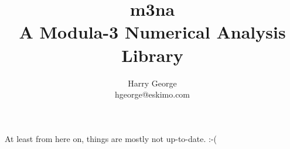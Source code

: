 \documentclass[fleqn]{article}
\title{m3na \\A Modula-3 Numerical Analysis Library}
\author{Harry George\\hgeorge@eskimo.com}
\begin{document}
\maketitle
\tableofcontents


%



\appendix
At least from here on,
things are mostly not up-to-date. :-(

%















\end{document}
